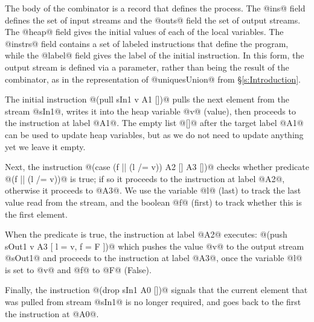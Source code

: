 The body of the combinator is a record that defines the process. The @ins@ field defines the set of input streams and the @outs@ field the set of output streams. The @heap@ field gives the initial values of each of the local variables. The @instrs@ field contains a set of labeled instructions that define the program, while the @label@ field gives the label of the initial instruction. In this form, the output stream is defined via a parameter, rather than being the result of the combinator, as in the representation of @uniquesUnion@ from \S\ref{s:Introduction}. 

The initial instruction @(pull sIn1 v A1 [])@ pulls the next element from the stream @sIn1@, writes it into the heap variable @v@ (value), then proceeds to the instruction at label @A1@. The empty list @[]@ after the target label @A1@ can be used to update heap variables, but as we do not need to update anything yet we leave it empty. 

Next, the instruction @(case (f || (l /= v)) A2 [] A3 [])@ checks whether predicate @(f || (l /= v))@ is true; if so it proceeds to the instruction at label @A2@, otherwise it proceeds to @A3@. We use the variable @l@ (last) to track the last value read from the stream, and the boolean @f@ (first) to track whether this is the first element.

When the predicate is true, the instruction at label @A2@ executes:
@(push sOut1 v A3 [ l = v, f = F ])@
which pushes the value @v@ to the output stream @sOut1@ and proceeds to the instruction at label @A3@, once the variable @l@ is set to @v@ and @f@ to @F@ (False).

Finally, the instruction @(drop sIn1 A0 [])@ signals that the current element that was pulled from stream @sIn1@ is no longer required, and goes back to the first the instruction at @A0@. 


